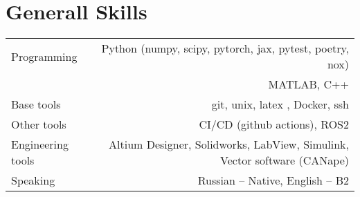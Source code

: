 \section*{Generall Skills}
\begin{tabular}{@{}L!{\VRule}R}
    Programming    & Python (numpy, scipy, pytorch, jax, pytest, poetry, nox) \\
    & MATLAB, C++                    \\
    Base tools & git, unix, latex , Docker, ssh \\
    Other tools &  CI/CD (github actions), ROS2 \\
    Engineering tools &  Altium Designer, Solidworks, LabView, Simulink, Vector software (CANape) \\
    Speaking      & Russian -- Native, English -- B2                      \\
\end{tabular}